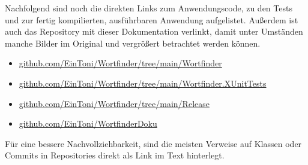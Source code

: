 Nachfolgend sind noch die direkten Links zum Anwendungscode, zu den Tests und zur fertig kompilierten, ausführbaren Anwendung aufgelistet. Außerdem ist auch das Repository mit dieser Dokumentation verlinkt, damit unter Umständen manche Bilder im Original und vergrößert betrachtet werden können.

\begin{itemize}
\item{\href{https://github.com/EinToni/Wortfinder/tree/main/Wortfinder}{github.com/EinToni/Wortfinder/tree/main/Wortfinder}}
\item{\href{https://github.com/EinToni/Wortfinder/tree/main/Wortfinder.XUnitTests}{github.com/EinToni/Wortfinder/tree/main/Wortfinder.XUnitTests}}
\item{\href{https://github.com/EinToni/Wortfinder/tree/main/Release}{github.com/EinToni/Wortfinder/tree/main/Release}}
\item{\href{https://github.com/EinToni/WortfinderDoku}{github.com/EinToni/WortfinderDoku}}
\end{itemize}

Für eine bessere Nachvollziehbarkeit, sind die meisten Verweise auf Klassen oder Commits in Repositories direkt als Link im Text hinterlegt.
